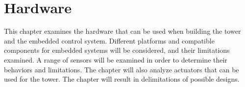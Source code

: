 \chapter{Hardware}\label{ch:hardware}
This chapter examines the hardware that can be used when building the tower and the embedded control system. Different platforms and compatible components for embedded systems will be considered, and their limitations examined. A range of sensors will be examined in order to determine their behaviors and limitations. The chapter will also analyze actuators that can be used for the tower. The chapter will result in delimitations of possible designs.





